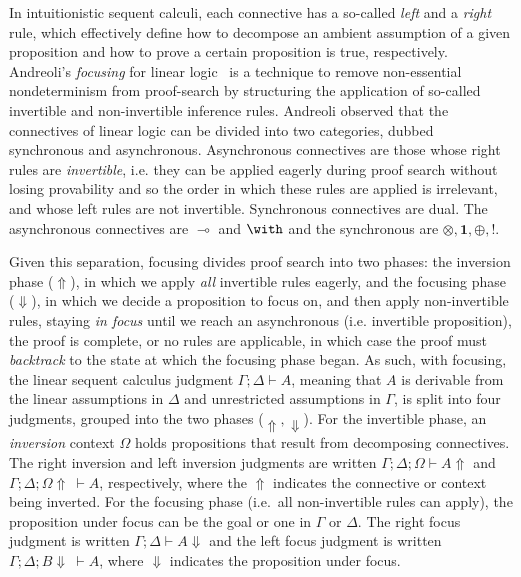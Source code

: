 \documentclass{llncs}
\newcommand{\lolli}{\multimap}
\newcommand{\tensor}{\otimes}
\newcommand{\bang}{{!}}
\begin{document}
%
%
In intuitionistic sequent calculi, each connective has a so-called \emph{left}
and a \emph{right} rule, which effectively define how to decompose an ambient
assumption of a given proposition and how to prove a certain proposition is
true, respectively.  Andreoli's \emph{focusing} for linear logic~\cite{Andreolli
focusing} is a technique to remove non-essential nondeterminism from
proof-search by structuring the application of so-called invertible and
non-invertible inference rules. Andreoli observed that the
connectives of linear logic can be divided into two categories, dubbed
synchronous and asynchronous. Asynchronous connectives are those whose
right rules are \emph{invertible}, i.e. they can be applied eagerly
during proof search without losing provability and so the order in
which these rules are applied is irrelevant, and whose left rules
are not invertible. Synchronous connectives are dual. The asynchronous  
connectives are $\lolli$ and $\with$ and the synchronous are
$\tensor,\textbf{1},\oplus,\bang$.

Given this separation, focusing divides proof search into two
phases: %
the inversion phase ($\Uparrow$), in which we apply \emph{all}
invertible rules eagerly, and the focusing phase ($\Downarrow$), in
which we decide a proposition to focus on, and then apply
non-invertible rules, staying \emph{in focus} until we reach an
asynchronous (i.e. invertible proposition), the proof is complete, or
no rules are applicable, in which case the proof must \emph{backtrack}
to the state at which the focusing phase began.  As such, with
focusing, the linear sequent calculus judgment 
$\Gamma; \Delta \vdash A$, meaning that $A$ is derivable from the linear
assumptions in $\Delta$ and unrestricted assumptions in $\Gamma$,
is split into four judgments, grouped into the two phases ($\Uparrow,
\Downarrow$).
%
For the invertible phase, an \emph{inversion} 
context $\Omega$ holds propositions that result from
decomposing connectives. %
The right inversion and left inversion judgments are written
$\Gamma; \Delta; \Omega \vdash A \Uparrow$ and $\Gamma; \Delta;
\Omega \Uparrow\ \vdash A$, respectively, where the $\Uparrow$
indicates the connective or context being inverted.
For the focusing phase (i.e.~all non-invertible rules can apply), 
the proposition under focus can be the goal or 
one in $\Gamma$ or $\Delta$. The right focus judgment is written 
$\Gamma;\Delta \vdash A \Downarrow$ and the left focus judgment is
written $\Gamma;\Delta; B\Downarrow\ \vdash A$, where $\Downarrow$
indicates the proposition under focus.
\end{document}
